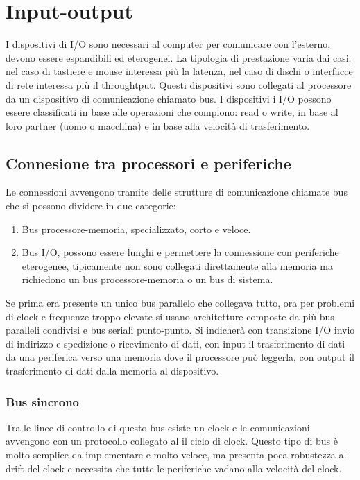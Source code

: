 \chapter{Input-output}
I dispositivi di I/O sono necessari al computer per comunicare con l'esterno, devono essere espandibili ed eterogenei. La tipologia di prestazione varia dai casi: 
nel caso di tastiere e mouse interessa pi\`u la latenza, nel caso di dischi o interfacce di rete interessa pi\`u il throughtput. Questi dispositivi sono collegati al
processore da un dispositivo di comunicazione chiamato bus. I dispositivi i I/O possono essere classificati in base alle operazioni che compiono: read o write, in base
al loro partner (uomo o macchina) e in base alla velocit\`a di trasferimento. 
\section{Connesione tra processori e periferiche}
Le connessioni avvengono tramite delle strutture di comunicazione chiamate bus che si possono dividere in due categorie:
\begin{enumerate}
\item Bus processore-memoria, specializzato, corto e veloce.
\item Bus I/O, possono essere lunghi e permettere la connessione con periferiche eterogenee, tipicamente non sono collegati direttamente alla memoria ma richiedono un
bus processore-memoria o un bus di sistema.
\end{enumerate}
Se prima era presente un unico bus parallelo che collegava tutto, ora per problemi di clock e frequenze troppo elevate si usano architetture composte da pi\`u bus 
paralleli condivisi e bus seriali punto-punto. Si indicher\`a con transizione I/O invio di indirizzo e spedizione o ricevimento di dati, con input il trasferimento di 
dati da una periferica verso una memoria dove il processore pu\`o leggerla, con output il trasferimento di dati dalla memoria al dispositivo. 
\subsection{Bus sincrono}
Tra le linee di controllo di questo bus esiste un clock e le comunicazioni avvengono con un protocollo collegato al il ciclo di clock. Questo tipo di bus \`e molto 
semplice da implementare e molto veloce, ma presenta poca robustezza al drift del clock e necessita che tutte le periferiche vadano alla velocit\`a del clock. 

